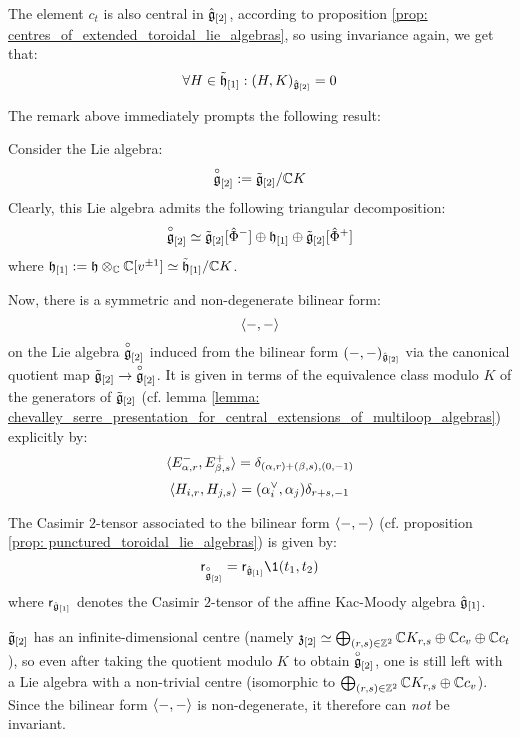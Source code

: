 \begin{remark}
\begin{enumerate}
                The element $c_t$ is also central in $\hat{\mathfrak{g}}_{[2]}$, according to proposition \ref{prop: centres_of_extended_toroidal_lie_algebras}, so using invariance again, we get that:
                    $$\forall H \in \tilde{\mathfrak{h}}_{[1]}: (H, K)_{\hat{\mathfrak{g}}_{[2]}} = 0$$
            \end{enumerate}
        \end{remark}
        The remark above immediately prompts the following result:
        \begin{proposition} \label{prop: punctured_toroidal_lie_algebras}
            Consider the Lie algebra:
                $$\overset{\circ}{\mathfrak{g}}_{[2]} := \tilde{\mathfrak{g}}_{[2]}/\mathbb{C} K$$
            Clearly, this Lie algebra admits the following triangular decomposition:
                $$\overset{\circ}{\mathfrak{g}}_{[2]} \simeq \tilde{\mathfrak{g}}_{[2]}[\hat{\Phi}^-] \oplus \mathfrak{h}_{[1]} \oplus \tilde{\mathfrak{g}}_{[2]}[\hat{\Phi}^+]$$
            where $\h_{[1]} := \h \tensor_{\bbC} \bbC[v^{\pm 1}] \cong \tilde{\h}_{[1]}/\bbC K$.
        
            Now, there is a symmetric and non-degenerate bilinear form:
                $$\langle-, -\rangle$$
            on the Lie algebra $\overset{\circ}{\mathfrak{g}}_{[2]}$ induced from the bilinear form $(-, -)_{\hat{\mathfrak{g}}_{[2]}}$ via the canonical quotient map $\tilde{\mathfrak{g}}_{[2]} \to \overset{\circ}{\mathfrak{g}}_{[2]}$. It is given in terms of the equivalence class modulo $K$ of the  generators of $\tilde{\mathfrak{g}}_{[2]}$ (cf. lemma \ref{lemma: chevalley_serre_presentation_for_central_extensions_of_multiloop_algebras}) explicitly by:
                $$\langle E_{\alpha, r}^-, E_{\beta, s}^+ \rangle = \delta_{(\alpha, r) + (\beta, s), (0, -1)}$$
                $$\langle H_{i, r}, H_{j, s} \rangle = (\alpha_i^{\vee}, \alpha_j) \delta_{r + s, -1}$$
        \end{proposition}
        \begin{corollary}
            The Casimir $2$-tensor associated to the bilinear form $\langle-, -\rangle$ (cf. proposition \ref{prop: punctured_toroidal_lie_algebras}) is given by:
                $$\sfr_{\punc{\g}_{[2]}} = \sfr_{\hat{\g}_{[1]}} \1(t_1, t_2)$$
            where $\mathsf{r}_{\hat{\mathfrak{g}}_{[1]}}$ denotes the Casimir $2$-tensor of the affine Kac-Moody algebra $\hat{\mathfrak{g}}_{[1]}$.
        \end{corollary}
        \begin{remark}
            $\tilde{\mathfrak{g}}_{[2]}$ has an infinite-dimensional centre (namely $\mathfrak{z}_{[2]} \simeq \bigoplus_{(r, s) \in \mathbb{Z}^2} \mathbb{C} K_{r, s} \oplus \mathbb{C} c_v \oplus \mathbb{C} c_t$), so even after taking the quotient modulo $K$ to obtain $\overset{\circ}{\mathfrak{g}}_{[2]}$, one is still left with a Lie algebra with a non-trivial centre (isomorphic to $\bigoplus_{(r, s) \in \mathbb{Z}^2} \mathbb{C} K_{r, s} \oplus \mathbb{C} c_v$). Since the bilinear form $\langle-, -\rangle$ is non-degenerate, it therefore can \textit{not} be invariant.
        \end{remark}
